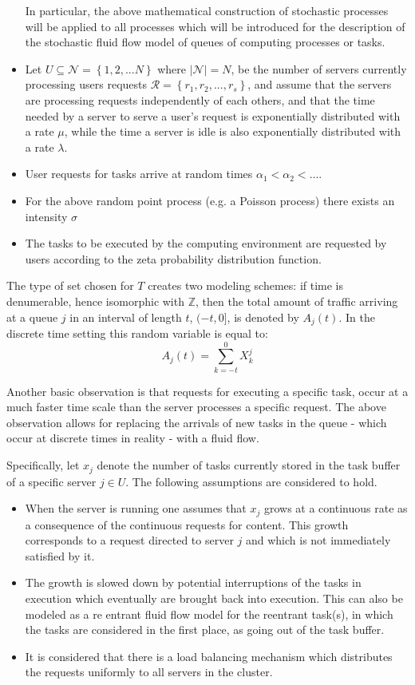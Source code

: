 \begin{itemize}
In particular, the above mathematical construction of stochastic processes will be applied to all processes which will be introduced for the description of the stochastic fluid flow model of queues of computing processes or tasks.
\item  Let $U\subseteq \mathcal{N} = \left\{1, 2, ...N\right\}$ where $\left\vert{\mathcal{N}}\right\vert=N$, be the number of servers currently processing users requests $\mathcal{R}= \left\{r_{1}, r_{2},...,r_{s}\right\}$, and assume that the servers are processing requests independently of each others, and that the time needed by a server to serve a user's request is exponentially distributed with a rate $\mu$, while the time a server is idle is also exponentially distributed with a rate $\lambda$.
\item User requests for tasks arrive at random times $\alpha_{1} < \alpha_{2} < ...$.
\item For the above random point process (e.g. a Poisson process) there exists an intensity $\sigma$
\item The tasks to be executed by the computing environment are requested by users according to the zeta probability distribution function.
\end{itemize}

The type of set chosen for $T$ creates two modeling schemes: if time is denumerable, hence isomorphic with $\mathbb{Z}$, then 
the total amount of traffic arriving at a queue $j$ in an interval of length $t$, $(-t, 0]$, is denoted by $A_j(t)$. In the discrete time setting this random variable is equal to: \[A_j(t) = \sum_{k=-t}^{0}X^j_k\] 

Another basic observation is that requests for executing a specific task, occur at a much faster time scale than the server processes a specific request. The above observation allows for replacing the arrivals of new tasks in the queue - which occur at discrete times in reality - with a fluid flow.

Specifically, let $x_{j}$ denote the number of tasks currently stored in the task buffer of a specific server $j\in U$.
The following assumptions are considered to hold.
\begin{itemize}
\item   When the server is running one assumes that $x_{j}$ grows at a continuous rate as a consequence of the continuous requests for content. This growth corresponds to a request directed to server $j$ and which is not immediately satisfied by it. 
\item The growth is slowed down by potential interruptions of the tasks in execution which eventually are brought back into execution. This can also be modeled as a re entrant fluid flow model for the reentrant task(s), in which the tasks are considered in the first place, as going out of the task buffer.
\item It is considered that there is a load balancing mechanism which distributes the requests uniformly to all servers in the cluster.
\end{itemize}

